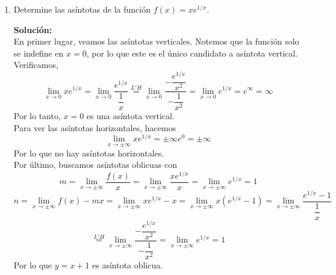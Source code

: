 \documentclass[12pt]{article}
\newenvironment{solucion}
{\begin{mdframed}[backgroundcolor=black!10]
		{\bf Solución:}\\
	}
	{
	\end{mdframed}
}
\newenvironment{preguntas}
{\begin{enumerate}\itemsep12pt
	}
	{
	\end{enumerate}
}
\newcommand{\ra}{\rightarrow}
\newcommand{\lh}{\stackrel{L'H}{=}}
\begin{document}
\begin{preguntas}
\begin{solucion}
\begin{enumerate}[a)]
Reordenando,
$$\lim\limits_{x\ra \infty} bx\ln\left(1+\dfrac{a}{x}\right) =
\lim\limits_{x\ra \infty} \dfrac{\ln\left(1+\dfrac{a}{x}\right)}{\dfrac{1}{bx}} = \dfrac{0}{0} $$
Luego,
{\scriptsize$$\stackrel{L'H}{=} \lim\limits_{x\ra \infty}  \dfrac{\dfrac{-\frac{a}{x^2}}{1+\frac{a}{x}}}{-\dfrac{b}{(bx)^2}} =
\lim\limits_{x\ra \infty} \dfrac{\dfrac{\frac{a}{x^2}}{\frac{a+x}{x}}}{\dfrac{1}{bx^2}} =
\lim\limits_{x\ra \infty} \dfrac{\dfrac{ax}{x^2(a+x)}}{\dfrac{1}{bx^2}} =
\lim\limits_{x\ra \infty} \dfrac{abx^3}{x^2(a+x)} =
\lim\limits_{x\ra \infty} \dfrac{abx}{a+x} \stackrel{L'H}{=} 
\lim\limits_{x\ra \infty} ab = ab$$}\\
Finalmente,
$$\lim\limits_{x\ra \infty} \left(1+\dfrac{a}{x}\right)^{bx} = e^{ab}$$
\end{enumerate}
\end{solucion}
\item Determine las asíntotas de la función $f(x) = xe^{1/x}$.
\begin{solucion}
En primer lugar, veamos las asíntotas verticales. Notemos que la función solo se indefine en $x=0$, por lo que este es el único candidato a asíntota vertical.\\

Verificamos,
$$\lim\limits_{x \ra 0} xe^{1/x} = 
\lim\limits_{x \ra 0} \dfrac{e^{1/x}}{\dfrac{1}{x}} \lh
\lim\limits_{x \ra 0} \dfrac{-\dfrac{e^{1/x}}{x^2}}{-\dfrac{1}{x^2}} =
\lim\limits_{x \ra 0} e^{1/x} =
e^{\infty} = \infty
$$
Por lo tanto, $x = 0$ es una asíntota vertical.\\

Para ver las asíntotas horizontales, hacemos
$$\lim\limits_{x \ra \pm \infty} xe^{1/x} = \pm \infty e^0 = \pm \infty$$
Por lo que no hay asíntotas horizontales.\\

Por último, buscamos asíntotas oblicuas con
$$m = 
\lim\limits_{x \ra \pm \infty} \dfrac{f(x)}{x} =
\lim\limits_{x \ra \pm \infty} \dfrac{xe^{1/x}}{x} =
\lim\limits_{x \ra \pm \infty} e^{1/x} =
1$$
$$n = 
\lim\limits_{x \ra \pm \infty} f(x) - mx =
\lim\limits_{x \ra \pm \infty} xe^{1/x} - x =
\lim\limits_{x \ra \pm \infty} x(e^{1/x} - 1) =
\lim\limits_{x \ra \pm \infty} \dfrac{e^{1/x} - 1}{\dfrac{1}{x}}$$
$$\lh
\lim\limits_{x \ra \pm \infty} \dfrac{-\dfrac{e^{1/x}}{x^2}}{-\dfrac{1}{x^2}} =
\lim\limits_{x \ra \pm \infty} e^{1/x} = 1
$$
Por lo que $y = x + 1$ es asíntota oblicua.
\end{solucion}
\end{preguntas}
\end{document}
